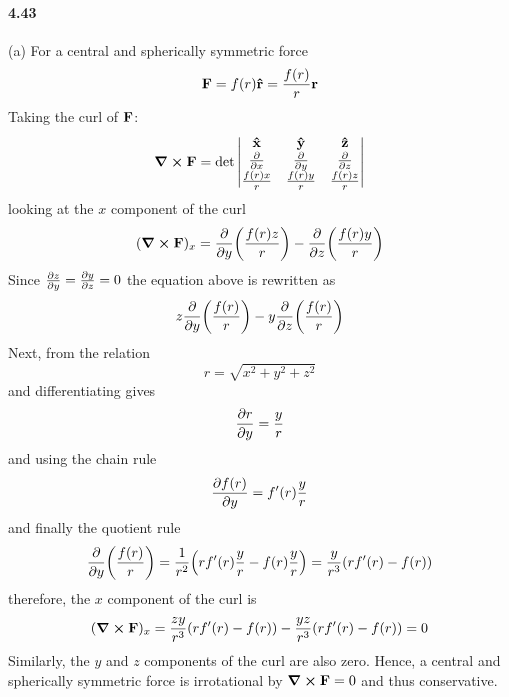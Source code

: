 \documentclass[../problems.tex]{subfiles}
\begin{document}
\paragraph{4.43}
(a) For a central and spherically symmetric force
\begin{equation*}
    \vb{F} = f(r) \vu{r} = \frac{f(r)}{r} \vb{r} 
\end{equation*}
Taking the curl of $\vb{F}$:
\begin{align*}
    \curl{\vb{F}} = \det \begin{vmatrix}
        \vu{x} & \vu{y} & \vu{z} \\
        \pdv{x} & \pdv{y} & \pdv{z} \\
        \frac{f(r)x}{r} & \frac{f(r)y}{r} & \frac{f(r)z}{r}
    \end{vmatrix}
\end{align*}
looking at the $x$ component of the curl
\begin{align*}
    (\curl{\vb{F}})_x = \pdv{y} (\frac{f(r)z}{r}) - \pdv{z} (\frac{f(r)y}{r})
\end{align*}
Since $\pdv{{z}}{y} = \pdv{y}{z} = 0$ the equation above is rewritten as
\begin{align*}
    z \pdv{y} (\frac{f(r)}{r}) - y \pdv{z} (\frac{f(r)}{r})
\end{align*}
Next, from the relation
\begin{equation*}
    r = \sqrt{x^2 + y^2 + z^2}
\end{equation*}
and differentiating gives
\begin{align*}
    \pdv{r}{y} = \frac{y}{r}
\end{align*}
and using the chain rule
\begin{equation*}
    \pdv{f(r)}{y} = f'(r)\frac{y}{r}
\end{equation*}
and finally the quotient rule
\begin{align*}
    \pdv{y} (\frac{f(r)}{r}) = \frac{1}{r^2} \quantity( r f'(r) \frac{y}{r} - f(r) \frac{y}{r} )
    = \frac{y}{r^3} \quantity( r f'(r) - f(r) )
\end{align*}
therefore, the $x$ component of the curl is
\begin{align*}
    (\curl{\vb{F}})_x = \frac{zy}{r^3} \quantity( r f'(r) - f(r) ) - \frac{yz}{r^3} \quantity( r
    f'(r) - f(r) ) = 0
\end{align*}
Similarly, the $y$ and $z$ components of the curl are also zero. Hence, a central and spherically
symmetric force is irrotational by $\curl{\vb{F}} = 0$ and thus conservative.
\end{document}
